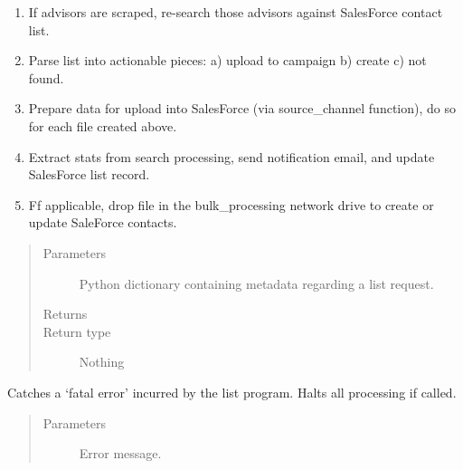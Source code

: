 \documentclass[letterpaper,10pt,english]{sphinxmanual}
\begin{document}
\begin{fulllineitems}
\begin{fulllineitems}
\begin{enumerate}
\item {} 
If advisors are scraped, re-search those advisors against SalesForce contact list.

\item {} 
Parse list into actionable pieces: a) upload to campaign b) create c) not found.

\item {} 
Prepare data for upload into SalesForce (via source\_channel function), do so for each file created above.

\item {} 
Extract stats from search processing, send notification email, and update SalesForce list record.

\item {} 
Ff applicable, drop file in the bulk\_processing network drive to create or update SaleForce contacts.

\end{enumerate}
\begin{quote}\begin{description}
\item[{Parameters}] \leavevmode
{} \textendash{} Python dictionary containing metadata regarding a list request.

\item[{Returns}] \leavevmode


\item[{Return type}] \leavevmode
Nothing

\end{description}\end{quote}

\end{fulllineitems}


\begin{fulllineitems}
\label{\detokenize{index:ListManagement.list_processing.ListProcessing.create_log_record_of_current_list_data}}
Catches a ‘fatal error’ incurred by the list program. Halts all processing if called.
\begin{quote}\begin{description}
\item[{Parameters}] \leavevmode
{} \textendash{} Error message.


\end{description}
\end{quote}
\end{fulllineitems}
\end{fulllineitems}
\end{document}
